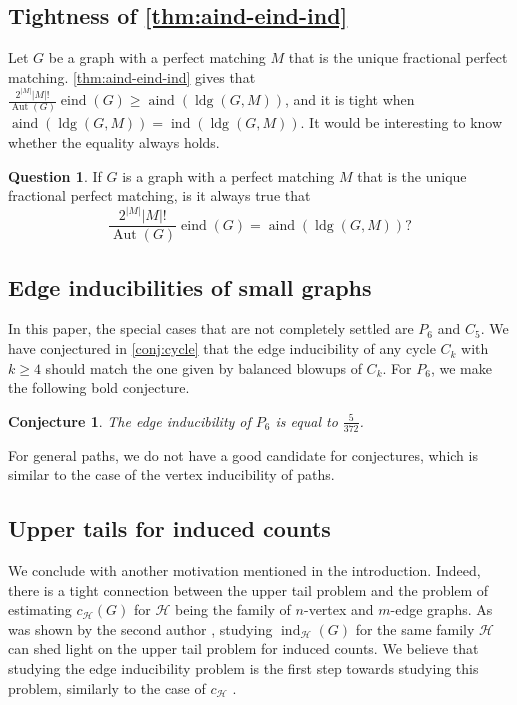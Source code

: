 \documentclass[reqno,11pt]{amsart}
\numberwithin{equation}{section}
\newtheorem{conjecture}[theorem]{Conjecture}
\theoremstyle{definition}
\newtheorem{question}[theorem]{Question}
\theoremstyle{remark}
\newcommand{\abs}[1]{\left\lvert#1\right\rvert}
\DeclareMathOperator{\ind}{ind}
\DeclareMathOperator{\eind}{eind}
\DeclareMathOperator{\aind}{aind}
\DeclareMathOperator{\ldg}{ldg}
\DeclareMathOperator{\Aut}{Aut}
\begin{document}
\subsection{Tightness of \cref{thm:aind-eind-ind}}
Let $G$ be a graph with a perfect matching $M$ that is the unique fractional perfect matching.
\cref{thm:aind-eind-ind} gives that $\frac{2^{\abs{M}}\abs{M}!}{\Aut(G)}\eind(G)\geq \aind(\ldg(G,M))$, and it is tight when $\aind(\ldg(G,M))=\ind(\ldg(G,M))$.
It would be interesting to know whether the equality always holds.

\begin{question}
    If $G$ is a graph with a perfect matching $M$ that is the unique fractional perfect matching, is it always true that
    \[\frac{2^{\abs{M}}\abs{M}!}{\Aut(G)}\eind(G)= \aind(\ldg(G,M))?\]
\end{question}

\subsection{Edge inducibilities of small graphs}
In this paper, the special cases that are not completely settled are $P_6$ and $C_5$.
We have conjectured in \cref{conj:cycle} that the edge inducibility of any cycle $C_k$ with $k\geq 4$ should match the one given by balanced blowups of $C_k$.
For $P_6$, we make the following bold conjecture.

\begin{conjecture}
    The edge inducibility of $P_6$ is equal to $\frac{5}{372}$.
\end{conjecture}
For general paths, we do not have a good candidate for conjectures, which is similar to the case of the vertex inducibility of paths.

\subsection{Upper tails for induced counts}
We conclude with another motivation mentioned in the introduction. Indeed, there is a tight connection between the upper tail problem and the problem of estimating $c_{\mathcal{H}}(G)$ for $\mathcal{H}$ being the family of $n$-vertex and $m$-edge graphs. As was shown by the second author \cite{Coh2024}, studying $\ind_{\mathcal{H}}(G)$ for the same family $\mathcal{H}$ can shed light on the upper tail problem for induced counts. We believe that studying the edge inducibility problem is the first step towards studying this problem, similarly to the case of $c_{\mathcal{H}}$ \cite{Alo1981, FriKah1998, JanOleRuc2004}.
\end{document}
